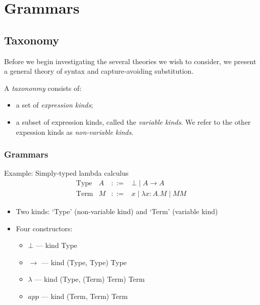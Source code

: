 \newcommand{\id}[1]{\mathsf{id}_{#1}}

\section{Grammars}

\subsection{Taxonomy}


Before we begin investigating the several theories we wish to consider, we present a general theory of syntax and
capture-avoiding substitution.

A \emph{taxononmy} consists of:
\begin{itemize}
\item a set of \emph{expression kinds};
\item a subset of expression kinds, called the \emph{variable kinds}.  We refer to the other expession kinds as \emph{non-variable kinds}.
\end{itemize}

\begin{frame}[fragile]
\frametitle{Grammars}
Example: Simply-typed lambda calculus
\[ \begin{array}{lrcl}
\text{Type} & A & ::= & \bot \mid A \rightarrow A \\
\text{Term} & M & ::= & x \mid \lambda x:A.M \mid M M
\end{array} \]

\begin{itemize}
\item
Two kinds: `Type' (non-variable kind) and `Term' (variable kind)
\item
Four constructors:
\begin{itemize}
\item
$\bot$ --- kind Type
\item
$\rightarrow$ --- kind (Type, Type) Type
\item
$\lambda$ --- kind (Type, (Term) Term) Term
\item
$app$ --- kind (Term, Term) Term
\end{itemize}
\end{itemize}
\end{frame}

